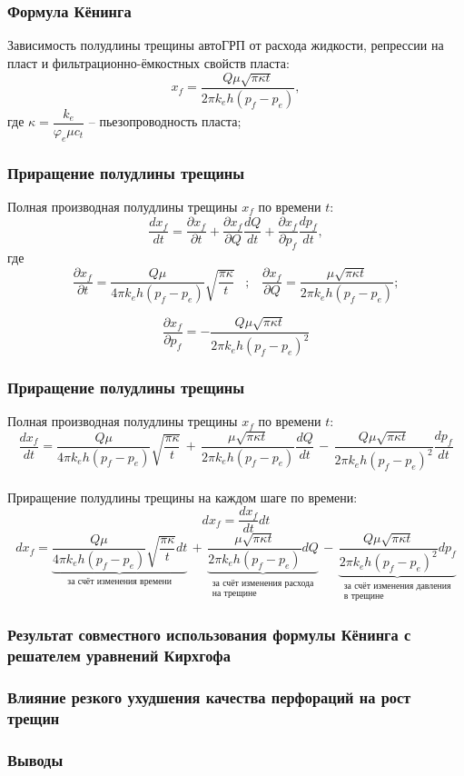 \documentclass{beamer}
\begin{document}
\begin{frame}
\frametitle{Формула Кёнинга}
Зависимость полудлины трещины автоГРП от расхода жидкости, репрессии на пласт и фильтрационно-ёмкостных свойств пласта:
$$
x_{\!f}=\frac{Q\mu\sqrt{\pi\kappa t}}{2\pi k_eh\left(p_{\!f}-p_e\right)},
$$
где
$\kappa=\dfrac{k_e}{\varphi_e\mu c_t}$ -- пьезопроводность пласта;
\end{frame}


\begin{frame}
\frametitle{Приращение полудлины трещины}

Полная производная полудлины трещины $x_{\!f}$ по времени $t$:
$$
\frac{dx_{\!f}}{dt}=\frac{\partial x_{\!f}}{\partial t}+\frac{\partial x_{\!f}}{\partial Q}\frac{dQ}{dt}+\frac{\partial x_{\!f}}{\partial p_{\!f}}\frac{dp_{\!f}}{dt},
$$
где
$$
\frac{\partial x_{\!f}}{\partial t}=\frac{Q\mu}{4\pi k_eh\left(p_{\!f}-p_e\right)}\sqrt{\frac{\pi\kappa}{t}}\,\,\,\,\,;\,\,\,\,\,\frac{\partial x_{\!f}}{\partial Q}=\frac{\mu\sqrt{\pi\kappa t}}{2\pi k_eh\left(p_{\!f}-p_e\right)};
$$

$$
\frac{\partial x_{\!f}}{\partial p_{\!f}}=-\frac{Q\mu\sqrt{\pi\kappa t}}{2\pi k_eh\left(p_{\!f}-p_e\right)^2}
$$
\end{frame}


\begin{frame}
\frametitle{Приращение полудлины трещины}

Полная производная полудлины трещины $x_{\!f}$ по времени $t$:
\small
$$
\frac{dx_{\!f}}{dt}=\frac{Q\mu}{4\pi k_eh\left(p_{\!f}-p_e\right)}\sqrt{\frac{\pi\kappa}{t}}\,+\,\frac{\mu\sqrt{\pi\kappa t}}{2\pi k_eh\left(p_{\!f}-p_e\right)}\frac{dQ}{dt}\,-\,\frac{Q\mu\sqrt{\pi\kappa t}}{2\pi k_eh\left(p_{\!f}-p_e\right)^2}\frac{dp_{\!f}}{dt}
$$
\normalsize
\ \\

Приращение полудлины трещины на каждом шаге по времени:
$$
dx_{\!f}=\frac{dx_{\!f}}{dt}dt
$$
\small
$$
dx_{\!f}=\underbrace{\frac{Q\mu}{4\pi k_eh\left(p_{\!f}-p_e\right)}\sqrt{\frac{\pi\kappa}{t}}dt}_{\text{за счёт изменения времени}}\,+\,\underbrace{\frac{\mu\sqrt{\pi\kappa t}}{2\pi k_eh\left(p_{\!f}-p_e\right)}dQ}_{\substack{\text{за счёт изменения расхода}\\\text{на трещине}}}\,-\,\underbrace{\frac{Q\mu\sqrt{\pi\kappa t}}{2\pi k_eh\left(p_{\!f}-p_e\right)^2}dp_{\!f}}_{\substack{\text{за счёт изменения давления}\\\text{в трещине}}}
$$
\normalsize

\end{frame}


\begin{frame}
\frametitle{Результат совместного использования формулы Кёнинга с решателем уравнений Кирхгофа}


\end{frame}

\begin{frame}
\frametitle{Влияние резкого ухудшения качества перфораций на рост трещин}

\end{frame}

\begin{frame}
\frametitle{Выводы}

\end{frame}
\end{document}
